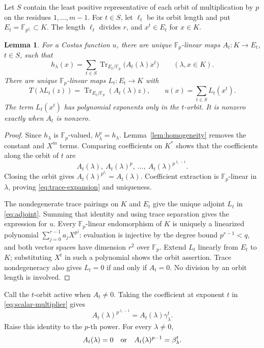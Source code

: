 \documentclass[11pt]{article}
\newtheorem{lemma}[theorem]{Lemma}
\theoremstyle{definition}
\theoremstyle{remark}
\newcommand{\Fp}{\mathbb F_p}
\newcommand{\Tr}{\operatorname{Tr}}
\numberwithin{equation}{section}
\begin{document}
Let \(S\) contain the least positive representative of each orbit of
multiplication by \(p\) on the residues \(1,\ldots,m-1\).
For \(t\in S\), let \(\ell_t\) be its orbit length and put
\(E_t=\mathbb F_{p^{\ell_t}}\subset K\).
The length \(\ell_t\) divides \(r\), and \(x^t\in E_t\) for \(x\in K\).

\begin{lemma}\label{lem:trace-expansion}
For a Costas function \(u\), there are unique \(\Fp\)-linear maps
\(A_t:K\to E_t\), \(t\in S\), such that
\begin{equation}\label{eq:trace-expansion}
 h_\lambda(x)=\sum_{t\in S}
 \Tr_{E_t/\Fp}\bigl(A_t(\lambda)x^t\bigr)
 \qquad(\lambda,x\in K).
\end{equation}
There are unique \(\Fp\)-linear maps \(L_t:E_t\to K\) with
\begin{equation}\label{eq:adjoint}
 T(\lambda L_t(z))=\Tr_{E_t/\Fp}(A_t(\lambda)z),
 \qquad u(x)=\sum_{t\in S}L_t(x^t).
\end{equation}
The term \(L_t(x^t)\) has polynomial exponents only in the \(t\)-orbit.
It is nonzero exactly when \(A_t\) is nonzero.
\end{lemma}
\begin{proof}
Since \(h_\lambda\) is \(\Fp\)-valued, \(h_\lambda^p=h_\lambda\).
Lemma~\ref{lem:homogeneity} removes the constant and \(X^m\) terms.
Comparing coefficients on \(K^*\) shows that the coefficients along
the orbit of \(t\) are
\[
 A_t(\lambda),\ A_t(\lambda)^p,\ \ldots,\
 A_t(\lambda)^{p^{\ell_t-1}}.
\]
Closing the orbit gives \(A_t(\lambda)^{p^{\ell_t}}=A_t(\lambda)\).
Coefficient extraction is \(\Fp\)-linear in \(\lambda\), proving
\eqref{eq:trace-expansion} and uniqueness.

The nondegenerate trace pairings on \(K\) and \(E_t\) give the unique
adjoint \(L_t\) in \eqref{eq:adjoint}. Summing that identity and using
trace separation gives the expression for \(u\).
Every \(\Fp\)-linear endomorphism of \(K\) is uniquely a linearized
polynomial \(\sum_{j=0}^{r-1}a_jX^{p^j}\): evaluation is injective by
the degree bound \(p^{r-1}<q\), and both vector spaces have dimension
\(r^2\) over \(\Fp\). Extend \(L_t\) linearly from \(E_t\) to \(K\);
substituting \(X^t\) in such a polynomial shows the orbit assertion.
Trace nondegeneracy also gives \(L_t=0\) if and only if \(A_t=0\).
No division by an orbit length is involved.
\end{proof}

Call the \(t\)-orbit active when \(A_t\ne0\).
Taking the coefficient at exponent \(t\) in
\eqref{eq:scalar-multiplier} gives
\[
 A_t(\lambda)^{p^{\ell_t-1}}
       =A_t(\lambda)\gamma_\lambda^t.
\]
Raise this identity to the \(p\)-th power. For every \(\lambda\ne0\),
\begin{equation}\label{eq:coefficient-multiplier}
 A_t(\lambda)=0
 \quad\hbox{or}\quad
 A_t(\lambda)^{p-1}=\beta_\lambda^t.
\end{equation}
\end{document}
